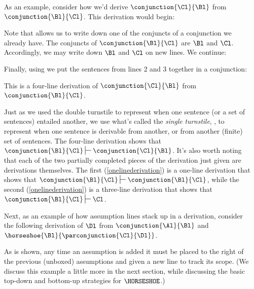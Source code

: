 As an example, consider how we'd derive $\conjunction{\Cl}{\Bl}$ from $\conjunction{\Bl}{\Cl}$. This derivation would begin:
\begin{gproof}[\label{onelinederivation}]
\end{gproof}
\noindent{}Note that  allows us to write down one of the conjuncts of a conjunction we already have. 
The conjuncts of $\conjunction{\Bl}{\Cl}$ are $\Bl$ and $\Cl$. 
Accordingly, we may write down $\Bl$ and $\Cl$ on new lines. 
We continue:
\begin{gproof}[\label{threelinederivation}]
\end{gproof}
\noindent{}Finally, using  we put the sentences from lines 2 and 3 together in a conjunction:
\begin{gproof}[\label{simpleconjunction}]
\end{gproof}
\noindent{}This is a four-line derivation of $\conjunction{\Cl}{\Bl}$ from $\conjunction{\Bl}{\Cl}$. 

Just as we used the double turnstile to represent when one sentence (or a set of sentences) entailed another, we use what's called the \emph{single turnstile}, \mention{\:$\sststile{}{}\:$}, to represent when one sentence is derivable from another, or from another (finite) set of sentences. 
The four-line derivation shows that $\conjunction{\Bl}{\Cl}\sststile{}{}\conjunction{\Cl}{\Bl}$. 
It's also worth noting that each of the two partially completed pieces of the derivation just given are derivations themselves. 
The first (\ref{onelinederivation}) is a one-line derivation that shows that $\conjunction{\Bl}{\Cl}\sststile{}{}\conjunction{\Bl}{\Cl}$, while the second (\ref{onelinederivation}) is a three-line derivation that shows that $\conjunction{\Bl}{\Cl}\sststile{}{}\Cl$.

Next, as an example of how assumption lines stack up in a derivation, consider the following derivation of $\Dl$ from $\conjunction{\Al}{\Bl}$ and $\horseshoe{\Bl}{\parconjunction{\Cl}{\Dl}}$.
\begin{gproof}[\label{secondexample}]
\end{gproof}
\noindent{}As is shown, any time an assumption is added it must be placed to the right of the previous (unboxed) assumptions and given a new line to track its scope. (We discuss this example a little more in the next section, while discussing the basic top-down and bottom-up strategies for $\HORSESHOE$.)


